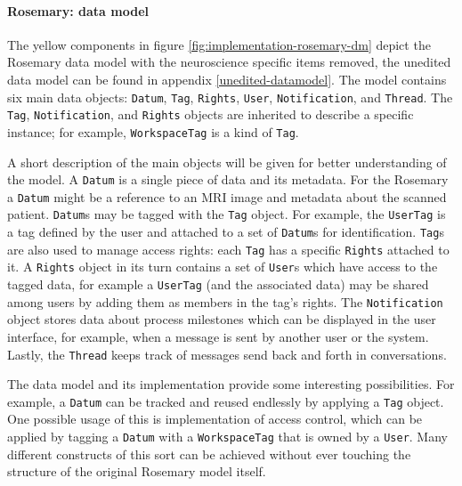 \paragraph{Rosemary: data model}
The yellow components in figure \ref{fig:implementation-rosemary-dm} depict the Rosemary data model with the neuroscience specific items removed, the unedited data model can be found in appendix \ref{unedited-datamodel}.
The model contains six main data objects: {\tt Datum}, {\tt Tag}, {\tt Rights}, {\tt User}, {\tt Notification}, and {\tt Thread}.
The {\tt Tag}, {\tt Notification}, and {\tt Rights} objects are inherited to describe a specific instance; for example, {\tt WorkspaceTag} is a kind of {\tt Tag}.

A short description of the main objects will be given for better understanding of the model.
A {\tt Datum} is a single piece of data and its metadata. 
For the Rosemary a {\tt Datum} might be a reference to an MRI image and metadata about the scanned patient.
{\tt Datum}s may be tagged with the {\tt Tag} object. 
For example, the {\tt UserTag} is a tag defined by the user and attached to a set of {\tt Datum}s for identification.
{\tt Tag}s are also used to manage access rights: each {\tt Tag} has a specific {\tt Rights} attached to it.
A {\tt Rights} object in its turn contains a set of {\tt User}s which have access to the tagged data, for example a {\tt UserTag} (and the associated data) may be shared among users by adding them as members in the tag's rights.
The {\tt Notification} object stores data about process milestones which can be displayed in the user interface, for example, when a message is sent by another user or the system.
Lastly, the {\tt Thread} keeps track of messages send back and forth in conversations.

The data model and its implementation provide some interesting possibilities.
For example, a {\tt Datum} can be tracked and reused endlessly by applying a {\tt Tag} object.
One possible usage of this is implementation of access control, which can be applied by tagging a {\tt Datum} with a {\tt WorkspaceTag} that is owned by a {\tt User}.
Many different constructs of this sort can be achieved without ever touching the structure of the  original Rosemary model itself.

